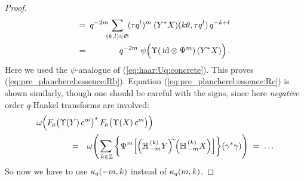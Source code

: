 \begin{proof}
\begin{eqnarray*}
\!\!&=&\!\!\!
    q^{-2m}  \!\!\! \sum_{(k,l)\in\mathfrak{S}}  \! (\tau q^l)^m \:
                       (Y^*X)(k\theta, \tau q^l) \, q^{-k+l}
\\
\!\!&=& \!\!\!
    q^{-2m} \; \psi \! \left(\Upsilon \!\left(\,\id \tens \Psi^m \right)(Y^* X) \vertL\right).
\end{eqnarray*}
Here we used the $\psi$-analogue of (\ref{eq:haar:Uq:concrete})\@.
This proves (\ref{eq:pre_plancherel:essence:Rb}).
Equation (\ref{eq:pre_plancherel:essence:Rc}) is shown similarly, though one
should be careful with the signs, since here {\em negative\/} order $q$-Hankel
transforms are involved:
\begin{eqnarray*}
\lefteqn{ \omega \!\left(\vertL \FRabb \!\left(\Upsilon(Y)\, c^m \vertM\right)^*
                \FRabb \!\left(\Upsilon(X)\, c^m \vertM\right) \right)}
\\&\hspace{4em}=&
    \omega \! \left(\sum_{\:k\in\ZZ} \left\{ \Psi^m \!
    \left[ \left(\YaH{-m}{k}Y\right)^{\!\!\sim} \!\!
           \left(\YaH{-m}{k}X\right)
    \right] \vertXL \! \right\}  \! (\gamma^*\gamma) \right)
\;=\;  \ldots
\end{eqnarray*}
So now we have to use $\kappa_q(-m,k)$ instead of $\kappa_q(m,k)$.


\end{proof}
